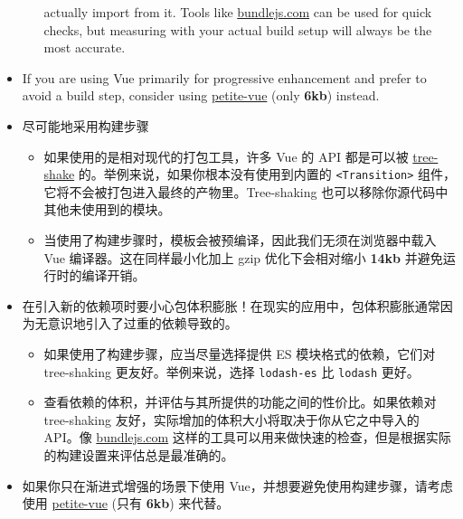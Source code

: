 \begin{paracol}{2}
\begin{itemize}
\begin{itemize}
    actually import from it. Tools like
    \href{https://bundlejs.com/}{bundlejs.com} can be used for quick
    checks, but measuring with your actual build setup will always be
    the most accurate.
    \end{itemize}
\item
    If you are using Vue primarily for progressive enhancement and prefer
    to avoid a build step, consider using
    \href{https://github.com/vuejs/petite-vue}{petite-vue} (only
    \textbf{6kb}) instead.
\end{itemize}
\switchcolumn
\begin{itemize}
\item
    尽可能地采用构建步骤
    \begin{itemize}
    \item
    如果使用的是相对现代的打包工具，许多 Vue 的 API 都是可以被
    \href{https://developer.mozilla.org/en-US/docs/Glossary/Tree_shaking}{tree-shake}
    的。举例来说，如果你根本没有使用到内置的
    \texttt{\textless{}Transition\textgreater{}}
    组件，它将不会被打包进入最终的产物里。Tree-shaking
    也可以移除你源代码中其他未使用到的模块。
    \item
    当使用了构建步骤时，模板会被预编译，因此我们无须在浏览器中载入 Vue
    编译器。这在同样最小化加上 gzip 优化下会相对缩小 \textbf{14kb}
    并避免运行时的编译开销。
    \end{itemize}
\item
    在引入新的依赖项时要小心包体积膨胀！在现实的应用中，包体积膨胀通常因为无意识地引入了过重的依赖导致的。
    \begin{itemize}
    \item
    如果使用了构建步骤，应当尽量选择提供 ES 模块格式的依赖，它们对
    tree-shaking 更友好。举例来说，选择 \texttt{lodash-es} 比
    \texttt{lodash} 更好。
    \item
    查看依赖的体积，并评估与其所提供的功能之间的性价比。如果依赖对
    tree-shaking 友好，实际增加的体积大小将取决于你从它之中导入的
    API。像 \href{https://bundlejs.com/}{bundlejs.com}
    这样的工具可以用来做快速的检查，但是根据实际的构建设置来评估总是最准确的。
    \end{itemize}
\item
    如果你只在渐进式增强的场景下使用
    Vue，并想要避免使用构建步骤，请考虑使用
    \href{https://github.com/vuejs/petite-vue}{petite-vue} (只有
    \textbf{6kb}) 来代替。
\end{itemize}
\end{paracol}



